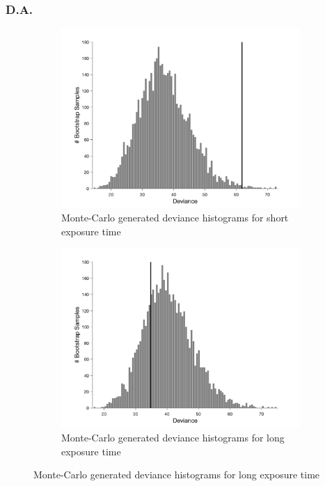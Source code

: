 \documentclass{article}
\begin{document}
\subsubsection*{D.A.}
\begin{figure}[!hb]
    \begin{subfigure}{0.494\textwidth}
        \centering
        \includegraphics[width = \linewidth]{Thesis/plots/gof/segDist/segDist_da_short_bootstrap.png}
        \caption{Monte-Carlo generated deviance histograms for short exposure time}
        \label{fig:da_gof_short_bootstrap}
    \end{subfigure}
    \hspace{0.01\textwidth}
    \begin{subfigure}{0.494\textwidth}
        \centering
        \includegraphics[width = \linewidth]{Thesis/plots/gof/segDist/segDist_da_long_bootstrap.png}
        \caption{Monte-Carlo generated deviance histograms for long exposure time}
        \label{fig:da_gof_long_bootstrap}
    \end{subfigure}
    

\end{figure}
\end{document}
